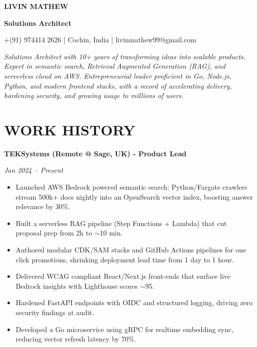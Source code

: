 \documentclass[11pt]{article}
\author{}
\date{}
\begin{document}
\begin{center}
{\Large \textbf{LIVIN MATHEW}}
\vspace{2pt}

\textbf{Solutions Architect}
\vspace{2pt}

+(91) 974414 2626 | Cochin, India | livinmathew99@gmail.com
\end{center}

\vspace{8pt}

\textit{Solutions Architect with 10+ years of transforming ideas into scalable products. Expert in semantic search, Retrieval Augmented Generation (RAG), and serverless cloud on AWS. Entrepreneurial leader proficient in Go, Node.js, Python, and modern frontend stacks, with a record of accelerating delivery, hardening security, and growing usage to millions of users.}

\vspace{8pt}

\section*{WORK HISTORY}

\textbf{TEKSystems (Remote @ Sage, UK) - Product Lead}

\textit{Jan 2024 -- Present}

\begin{itemize}
\item Launched AWS Bedrock powered semantic search: Python/Fargate crawlers stream 500k+ docs nightly into an OpenSearch vector index, boosting answer relevance by 30\%.
\item Built a serverless RAG pipeline (Step Functions + Lambda) that cut proposal prep from 2h to $\sim$10 min.
\item Authored modular CDK/SAM stacks and GitHub Actions pipelines for one click promotions, shrinking deployment lead time from 1 day to 1 hour.
\item Delivered WCAG compliant React/Next.js front-ends that surface live Bedrock insights with Lighthouse scores $\sim$95.
\item Hardened FastAPI endpoints with OIDC and structured logging, driving zero security findings at audit.
\item Developed a Go microservice using gRPC for realtime embedding sync, reducing vector refresh latency by 70\%.
\end{itemize}
\end{document}
